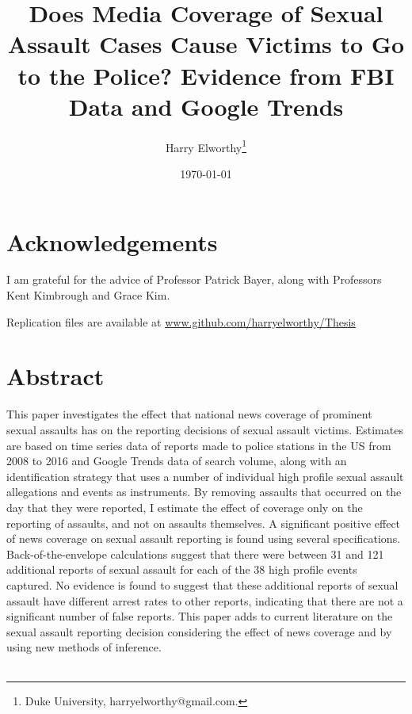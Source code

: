 \documentclass[AER,draftmode]{AEA}
\begin{document}

\title{Does Media Coverage of Sexual Assault Cases Cause Victims to Go to the Police? Evidence from FBI Data and Google Trends}
\author{Harry Elworthy\thanks{Duke University, harryelworthy@gmail.com.}}
\date{\today}
\pubMonth{}
\pubYear{}
\pubVolume{}
\pubIssue{}
\JEL{}
\Keywords{}

\maketitle


\section{Acknowledgements}

I am grateful for the advice of Professor Patrick Bayer, along with Professors Kent Kimbrough and Grace Kim. 

Replication files are available at \url{www.github.com/harryelworthy/Thesis}

\clearpage
\section{Abstract}

This paper investigates the effect that national news coverage of prominent sexual assaults has on the reporting decisions of sexual assault victims. Estimates are based on time series data of reports made to police stations in the US from 2008 to 2016 and Google Trends data of search volume, along with an identification strategy that uses a number of individual high profile sexual assault allegations and events as instruments. By removing assaults that occurred on the day that they were reported, I  estimate the effect of coverage only on the reporting of assaults, and not on assaults themselves. A significant positive effect of news coverage on sexual assault reporting is found using several specifications. Back-of-the-envelope calculations suggest that there were between 31 and 121 additional reports of sexual assault for each of the 38 high profile events captured. No evidence is found to suggest that these additional reports of sexual assault have different arrest rates to other reports, indicating that there are not a significant number of false reports. This paper adds to current literature on the sexual assault reporting decision considering the effect of news coverage and by using new methods of inference. \\ \\
\end{document}
